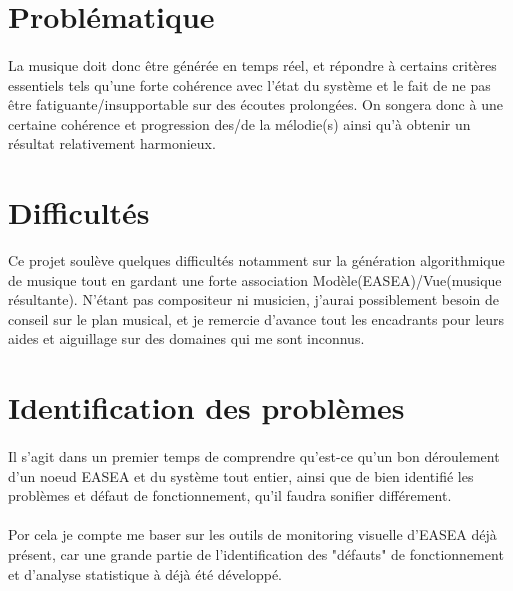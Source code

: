 \documentclass{article}
\begin{document}
  \section{Problématique} %
  \label{sec:problematique}
    \paragraph{} %
    \label{par:}
      La musique doit donc être générée en temps réel, et répondre à certains
      critères essentiels tels qu'une forte cohérence avec l'état du système et le
      fait de ne pas être fatiguante/insupportable sur des écoutes prolongées.
      On songera donc à une certaine cohérence et progression des/de la mélodie(s)
      ainsi qu'à obtenir un résultat relativement harmonieux. 

  \section{Difficultés} %
  \label{sec:Difficultes}
    Ce projet soulève quelques difficultés notamment sur la génération algorithmique
    de musique tout en gardant une forte association Modèle(EASEA)/Vue(musique
    résultante).
    N'étant pas compositeur ni musicien, j'aurai possiblement besoin de conseil sur
    le plan musical, et je remercie d'avance tout les encadrants pour leurs aides et
    aiguillage sur des domaines qui me sont inconnus.

  \section{Identification des problèmes} %
  \label{sec:Identification des problemes}
    \paragraph{} %
    \label{par:}
      Il s'agit dans un premier temps de comprendre qu'est-ce qu'un bon déroulement
      d'un noeud EASEA et du système tout entier, ainsi que de bien identifié les
      problèmes et défaut de fonctionnement, qu'il faudra sonifier différement.
    \paragraph{} %
    \label{par:}
      Por cela je compte me baser sur les outils de monitoring visuelle d'EASEA déjà
      présent, car une grande partie de l'identification des "défauts" de fonctionnement et d'analyse
      statistique à déjà été développé.
\end{document}
